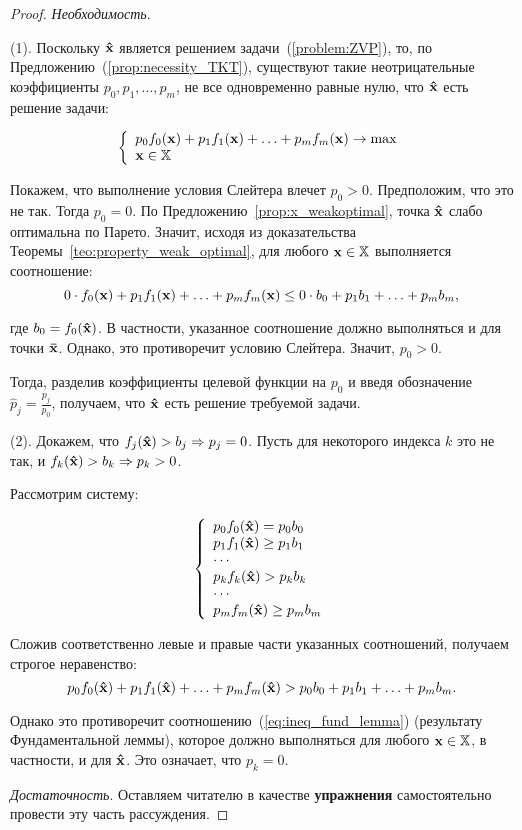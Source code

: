 \begin{proof}\emph{Необходимость}.

(1). Поскольку $\mathbf{\hat x}$ является решением
задачи~(\ref{problem:ZVP}), то, по
Предложению~(\ref{prop:necessity_TKT}), существуют такие
неотрицательные коэффициенты $p_0, p_1, \ldots, p_m$, не все
одновременно равные нулю, что $\mathbf{\hat x}$ есть решение задачи:

\[
\left\{ \begin{array}{l}
 p_0 f_0(\mathbf{x}) + p_1 f_1(\mathbf{x})+ \ldots + p_m f_m(\mathbf{x}) \to \max  \\
 \mathbf{x} \in \mathbb{X} \\
 \end{array} \right.
\]


Покажем, что выполнение условия Слейтера влечет $p_0 >0$.
Предположим, что это не так. Тогда $p_0=0$. По
Предложению~\ref{prop:x_weakoptimal}, точка $\mathbf{\hat x}$ слабо
оптимальна по Парето. Значит, исходя из доказательства
Теоремы~\ref{teo:property_weak_optimal}, для любого $\mathbf{x} \in
\mathbb{X}$ выполняется соотношение:
\[
0 \cdot f_0(\mathbf{x}) + p_1 f_1(\mathbf{x}) + \ldots + p_m f_m(\mathbf{x})
\leq 0\cdot b_0 + p_1 b_1 + \ldots + p_m b_m,
\]

\noindent где $b_0=f_0(\mathbf{\hat x})$. В частности, указанное
соотношение должно выполняться и для точки $\mathbf{\bar x}$. Однако,
это противоречит условию Слейтера. Значит, $p_0 > 0$.

Тогда, разделив коэффициенты целевой функции на $p_0$ и введя
обозначение $\hat p_j=\frac{p_j}{p_0}$, получаем, что $\mathbf{\hat x}$
есть решение требуемой задачи.

(2). Докажем, что $f_j(\mathbf{\hat x}) > b_j \Rightarrow p_j =0$. Пусть
для некоторого индекса $k$ это не так, и $f_k(\mathbf{\hat x}) > b_k
\Rightarrow p_k >0$.

Рассмотрим систему:

\[
\left\{ \begin{array}{l}
 p_0 f_0(\mathbf{\hat x}) = p_0 b_0\\
 p_1 f_1(\mathbf{\hat x}) \geq p_1 b_1 \\
  \cdots  \\
 p_k f_k(\mathbf{\hat x}) > p_k b_k \\
  \cdots  \\
 p_m f_m(\mathbf{\hat x}) \geq p_m b_m \\
  \end{array} \right.
\]

Сложив соответственно левые и правые части указанных соотношений,
получаем строгое неравенство:
\[ p_0 f_0(\mathbf{\hat x}) + p_1 f_1(\mathbf{\hat x}) + \ldots + p_m f_m(\mathbf{\hat x}) >
p_0 b_0 + p_1 b_1 + \ldots + p_m b_m.
\]

Однако это противоречит соотношению~(\ref{eq:ineq_fund_lemma})
(результату Фундаментальной леммы), которое должно выполняться для
любого $\mathbf{x} \in \mathbb{X}$, в частности, и для $\mathbf{\hat x}$. Это
означает, что $p_k=0$.

\emph{Достаточность}. Оставляем читателю в качестве
\textbf{упражнения} самостоятельно провести эту часть рассуждения.
\end{proof}

